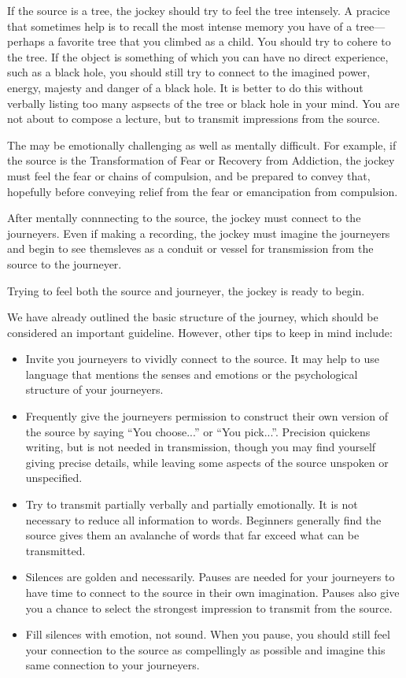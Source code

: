 \documentclass[12pt]{book}
\begin{document}
If the
source is a tree, the jockey should try to feel the
tree intensely. A pracice that sometimes help is to recall
the most intense memory you have of a tree---perhaps a
favorite tree that you climbed as a child. You
should try to cohere to the tree. If the object
is something of which you can have no direct
experience, such as a black hole, you should still
try to connect to the imagined power, energy, majesty
and danger of a black hole. It is better to
do this without verbally listing too many
aspsects of the tree or black hole in your mind.
You are not about to compose a lecture, but to
transmit impressions from the source.

The may be emotionally challenging as well as
mentally difficult.  For example, if the
source is the Transformation of Fear or
Recovery from Addiction, the jockey must feel
the fear or chains of compulsion, and be prepared to
convey that, hopefully before conveying relief
from the fear or emancipation from compulsion.

After mentally connnecting to the source,
the jockey must connect to the journeyers.
Even if making a recording, the jockey must
imagine the journeyers and begin to see
themsleves as a conduit or vessel for transmission
from the source to the journeyer.

Trying to feel both the source and journeyer,
the jockey is ready to begin.

We have already outlined the basic structure
of the journey, which should be considered
an important guideline.
However, other tips to keep in mind include:
\begin{itemize}
\item Invite you journeyers to vividly
  connect to the source. It may help to use language
  that mentions the senses and emotions or the
  psychological structure of your journeyers.
\item Frequently give the journeyers permission
  to construct their own version of the source
  by saying ``You choose...'' or ``You pick...''.
  Precision quickens writing, but is not needed in
  transmission, though you may find yourself giving
  precise details, while leaving some aspects of the
  source unspoken or unspecified.
\item Try to transmit partially verbally
  and partially emotionally. It is not necessary
  to reduce all information to words.  Beginners
  generally find the source gives them an avalanche
  of words that far exceed what can be transmitted.
\item Silences are golden and necessarily. Pauses
  are needed for your journeyers to have time to
  connect to the source in their own imagination.
  Pauses also give you a chance to select the strongest
  impression to transmit from the source.
\item Fill silences with emotion, not sound. When
  you pause, you should still feel your connection to the
  source as compellingly as possible and imagine this
  same connection to your journeyers.
\end{itemize}
\end{document}
